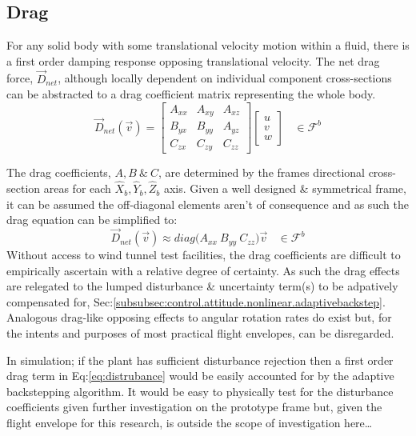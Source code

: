\subsection{Drag}
\label{subsec:dynamics.aero.drag}
For any solid body with some translational velocity motion within a fluid, there is a first order damping response opposing translational velocity. The net drag force, $\vec{D}_{net}$, although locally dependent on individual component cross-sections can be abstracted to a drag coefficient matrix representing the whole body.
\begin{equation}\label{eq:distrubance}
\vec{D}_{net}(\vec{v})=\begin{bmatrix}
A_{xx} & A_{xy} & A_{xz}\\
B_{yx} & B_{yy} & A_{yz}\\
C_{zx} & C_{zy} & C_{zz}
\end{bmatrix}
\begin{bmatrix}
u\\
v\\
w
\end{bmatrix}
~~~~\in\mathcal{F}^b
\end{equation}
\par
The drag coefficients, $A,B~\&~C$, are determined by the frames directional cross-section areas for each $\hat{X}_b,\hat{Y}_b,\hat{Z}_b$ axis. Given a well designed \& symmetrical frame, it can be assumed the off-diagonal elements aren't of consequence and as such the drag equation can be simplified to:
\begin{equation}
\vec{D}_{net}(\vec{v})\approx diag\big(A_{xx}~B_{yy}~C_{zz}\big)\vec{v}~~~~\in\mathcal{F}^b
\end{equation}
Without access to wind tunnel test facilities, the drag coefficients are difficult to empirically ascertain with a relative degree of certainty. As such the drag effects are relegated to the lumped disturbance \& uncertainty term(s) to be adpatively compensated for, Sec:\ref{subsubsec:control.attitude.nonlinear.adaptivebackstep}. Analogous drag-like opposing effects to angular rotation rates do exist but, for the intents and purposes of most practical flight envelopes, can be disregarded.
\par
In simulation; if the plant has sufficient disturbance rejection then a first order drag term in Eq:\ref{eq:distrubance} would be easily accounted for by the adaptive backstepping algorithm. It would be easy to physically test for the disturbance coefficients given further investigation on the prototype frame but, given the flight envelope for this research, is outside the scope of investigation here\ldots
